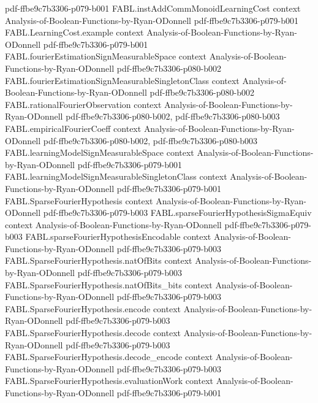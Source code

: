 \begin{theorem}
  {pdf-ffbe9c7b3306-p079-b001}
\proofstep
  {FABL.instAddCommMonoidLearningCost}
  {context}
  {Analysis-of-Boolean-Functions-by-Ryan-ODonnell}
  {pdf-ffbe9c7b3306-p079-b001}
\proofstep
  {FABL.LearningCost.example}
  {context}
  {Analysis-of-Boolean-Functions-by-Ryan-ODonnell}
  {pdf-ffbe9c7b3306-p079-b001}
\proofstep
  {FABL.fourierEstimationSignMeasurableSpace}
  {context}
  {Analysis-of-Boolean-Functions-by-Ryan-ODonnell}
  {pdf-ffbe9c7b3306-p080-b002}
\proofstep
  {FABL.fourierEstimationSignMeasurableSingletonClass}
  {context}
  {Analysis-of-Boolean-Functions-by-Ryan-ODonnell}
  {pdf-ffbe9c7b3306-p080-b002}
\proofstep
  {FABL.rationalFourierObservation}
  {context}
  {Analysis-of-Boolean-Functions-by-Ryan-ODonnell}
  {pdf-ffbe9c7b3306-p080-b002,
    pdf-ffbe9c7b3306-p080-b003}
\proofstep
  {FABL.empiricalFourierCoeff}
  {context}
  {Analysis-of-Boolean-Functions-by-Ryan-ODonnell}
  {pdf-ffbe9c7b3306-p080-b002,
    pdf-ffbe9c7b3306-p080-b003}
\proofstep
  {FABL.learningModelSignMeasurableSpace}
  {context}
  {Analysis-of-Boolean-Functions-by-Ryan-ODonnell}
  {pdf-ffbe9c7b3306-p079-b001}
\proofstep
  {FABL.learningModelSignMeasurableSingletonClass}
  {context}
  {Analysis-of-Boolean-Functions-by-Ryan-ODonnell}
  {pdf-ffbe9c7b3306-p079-b001}
\proofstep
  {FABL.SparseFourierHypothesis}
  {context}
  {Analysis-of-Boolean-Functions-by-Ryan-ODonnell}
  {pdf-ffbe9c7b3306-p079-b003}
\proofstep
  {FABL.sparseFourierHypothesisSigmaEquiv}
  {context}
  {Analysis-of-Boolean-Functions-by-Ryan-ODonnell}
  {pdf-ffbe9c7b3306-p079-b003}
\proofstep
  {FABL.sparseFourierHypothesisEncodable}
  {context}
  {Analysis-of-Boolean-Functions-by-Ryan-ODonnell}
  {pdf-ffbe9c7b3306-p079-b003}
\proofstep
  {FABL.SparseFourierHypothesis.natOfBits}
  {context}
  {Analysis-of-Boolean-Functions-by-Ryan-ODonnell}
  {pdf-ffbe9c7b3306-p079-b003}
\proofstep
  {FABL.SparseFourierHypothesis.natOfBits_bits}
  {context}
  {Analysis-of-Boolean-Functions-by-Ryan-ODonnell}
  {pdf-ffbe9c7b3306-p079-b003}
\proofstep
  {FABL.SparseFourierHypothesis.encode}
  {context}
  {Analysis-of-Boolean-Functions-by-Ryan-ODonnell}
  {pdf-ffbe9c7b3306-p079-b003}
\proofstep
  {FABL.SparseFourierHypothesis.decode}
  {context}
  {Analysis-of-Boolean-Functions-by-Ryan-ODonnell}
  {pdf-ffbe9c7b3306-p079-b003}
\proofstep
  {FABL.SparseFourierHypothesis.decode_encode}
  {context}
  {Analysis-of-Boolean-Functions-by-Ryan-ODonnell}
  {pdf-ffbe9c7b3306-p079-b003}
\proofstep
  {FABL.SparseFourierHypothesis.evaluationWork}
  {context}
  {Analysis-of-Boolean-Functions-by-Ryan-ODonnell}
  {pdf-ffbe9c7b3306-p079-b001}
\proofstep

\end{theorem}
